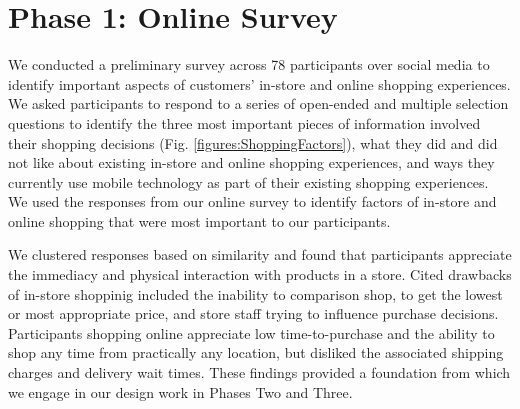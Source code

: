 \section{Phase 1: Online Survey}

We conducted a preliminary survey across 78 participants over social media to identify important aspects of customers' in-store and online shopping experiences. We asked participants to respond to a series of open-ended and multiple selection questions to identify the three most important pieces of information involved their shopping decisions (Fig. \ref{figures:ShoppingFactors}), what they did and did not like about existing in-store and online shopping experiences, and ways they currently use mobile technology as part of their existing shopping experiences.
We used the responses from our online survey to
identify 
factors of in-store and online shopping that were most important to our participants. 

We clustered responses based on similarity and found that participants appreciate the immediacy and physical interaction with products in a store. Cited drawbacks of in-store shoppinig included the inability to comparison shop, to get the lowest or most appropriate price, and store staff trying to influence purchase decisions.  Participants shopping online appreciate low time-to-purchase and the ability to shop any time from practically any location, but disliked the associated shipping charges and delivery wait times. These findings provided a foundation from which we engage in our design work in Phases Two and Three. 

